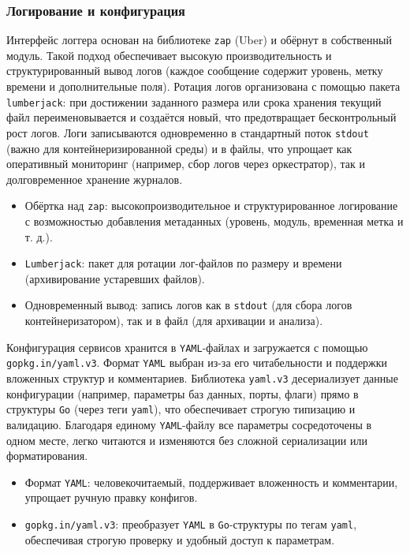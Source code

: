 \subsubsection*{Логирование и конфигурация}
Интерфейс логгера основан на библиотеке \texttt{zap} (Uber) и обёрнут в собственный модуль. Такой подход обеспечивает высокую производительность и структурированный вывод логов (каждое сообщение содержит уровень, метку времени и дополнительные поля). Ротация логов организована с помощью пакета \texttt{lumberjack}: при достижении заданного размера или срока хранения текущий файл переименовывается и создаётся новый, что предотвращает бесконтрольный рост логов. Логи записываются одновременно в стандартный поток \texttt{stdout} (важно для контейнеризированной среды) и в файлы, что упрощает как оперативный мониторинг (например, сбор логов через оркестратор), так и долговременное хранение журналов.
\begin{itemize}
    \item Обёртка над \texttt{zap}: высокопроизводительное и структурированное логирование с возможностью добавления метаданных (уровень, модуль, временная метка и т. д.).
    \item \texttt{Lumberjack}: пакет для ротации лог-файлов по размеру и времени (архивирование устаревших файлов).
    \item Одновременный вывод: запись логов как в \texttt{stdout} (для сбора логов контейнеризатором), так и в файл (для архивации и анализа).
\end{itemize}
Конфигурация сервисов хранится в \texttt{YAML}-файлах и загружается с помощью \texttt{gopkg.in/yaml.v3}. Формат \texttt{YAML} выбран из-за его читабельности и поддержки вложенных структур и комментариев. Библиотека \texttt{yaml.v3} десериализует данные конфигурации (например, параметры баз данных, порты, флаги) прямо в структуры \texttt{Go} (через теги \texttt{yaml}), что обеспечивает строгую типизацию и валидацию. Благодаря единому \texttt{YAML}-файлу все параметры сосредоточены в одном месте, легко читаются и изменяются без сложной сериализации или форматирования.
\begin{itemize}
    \item Формат \texttt{YAML}: человекочитаемый, поддерживает вложенность и комментарии, упрощает ручную правку конфигов.
    \item \texttt{gopkg.in/yaml.v3}: преобразует \texttt{YAML} в \texttt{Go}-структуры по тегам \texttt{yaml}, обеспечивая строгую проверку и удобный доступ к параметрам.
\end{itemize}

